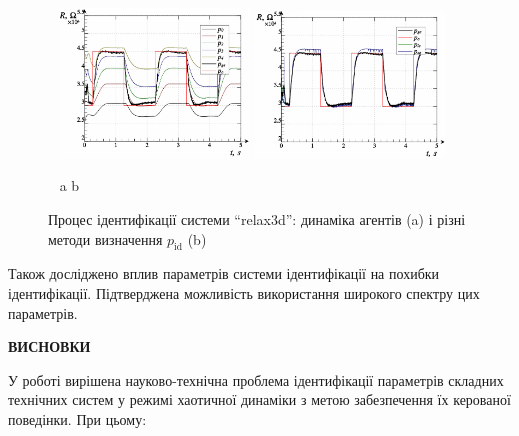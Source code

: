 \documentclass[a4paper,13pt]{atuaref}
\newcommand{\xsect}[1]{\medskip\begin{center}\textbf{#1}\end{center}\medskip\penalty10000}
\begin{document}
\begin{figure}[htb!]
  \centerline{
    ~ \hfill
    \includegraphics[width=0.45\textwidth]{p7/p/relax3d_read_id2-p_p_00_xl.png}
    \hfill
    \includegraphics[width=0.45\textwidth]{p7/p/relax3d_read_id2-p_pp_00_xl.png}
    \hfill ~
  }
  \vspace{-1.7ex}
  \begin{center}
    ~ \hfill a \hfill\hfill b \hfill ~
  \end{center}
  \vspace{-2.7ex}
  \caption{Процес ідентифікації системи ``relax3d'':
  динаміка агентів (a) і різні методи визначення $p_\mathrm{id}$ (b)}
  \label{atu:f:relax3d_id_1}
\end{figure}

Також досліджено вплив параметрів системи ідентифікації на похибки ідентифікації.
Підтверджена можливість використання широкого спектру цих параметрів.



\xsect{ВИСНОВКИ}

У роботі вирішена науково-технічна проблема ідентифікації параметрів складних технічних
систем у режимі хаотичної динаміки
з метою забезпечення їх керованої поведінки. При цьому:
\end{document}
